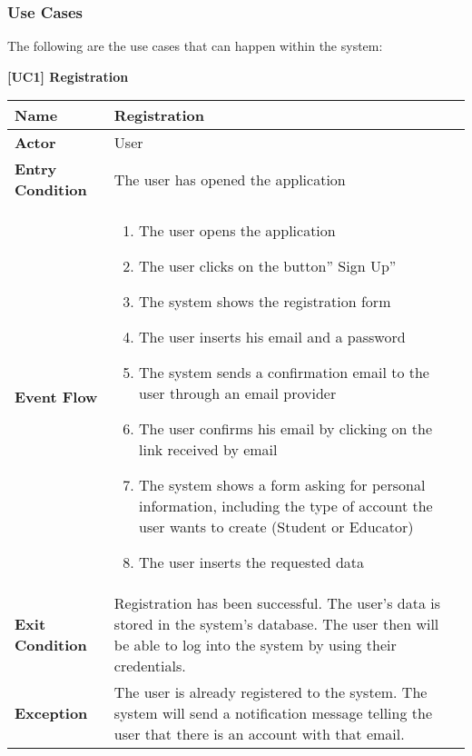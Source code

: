 \documentclass{article}
\begin{document}
\subsubsection{Use Cases}
The following are the use cases that can happen within the system:
\begin{table}[H]
 \renewcommand{\arraystretch}{1.5}
    \centering
    \raggedright\textbf{[UC1] Registration }
    \begin{tabular}{|l|p{10cm}|}
        \hline
        \textbf{Name} & Registration \\
        \hline
        \textbf{Actor} & User \\
        \hline
        \textbf{Entry Condition} & 
        The user has opened the application \\
        \hline
        \textbf{Event Flow} & 
        \begin{enumerate}[align=left, topsep=0pt, partopsep=0pt]
            \item The user opens the application 
            \item The user clicks on the button” Sign Up” 
            \item The system shows the registration form 
            \item The user inserts his email and a password 
            \item The system sends a confirmation email to the user through an email provider 
            \item The user confirms his email by clicking on the link received by email 
            \item The system shows a form asking for personal information, including the type of account the user wants to create (Student or Educator)
            \item The user inserts the requested data 
        \end{enumerate} \\
        \hline
        \textbf{Exit Condition} & Registration has been successful. The user’s data is stored in the system’s database. The user then will be able to log into the system by using their credentials.  \\
        \hline
        \textbf{Exception} & The user is already registered to the system. The system will send a notification message telling the user that there is an account with that email. \\
        \hline
    \end{tabular}
\end{table}
\end{document}

